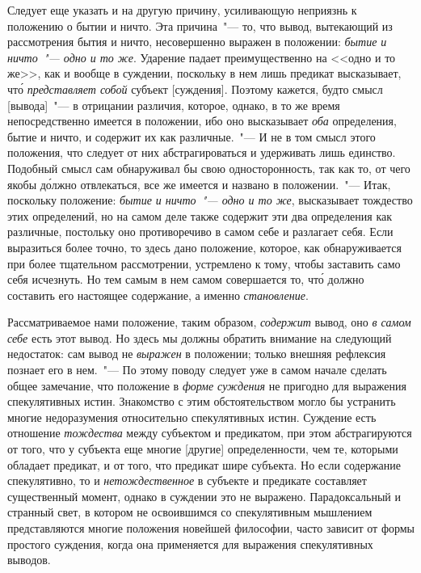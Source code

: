 Следует еще указать и на другую причину, усиливающую
неприязнь к положению о бытии и ничто. Эта причина~"--- то,
что вывод, вытекающий из рассмотрения бытия
и ничто, несовершенно выражен в положении: \emph{бытие
и ничто~"--- одно и то же}. Ударение падает преимущественно
на <<одно и то же>>, как и вообще в суждении, поскольку
в нем лишь предикат высказывает, чт\'о \emph{представляет
собой} субъект [суждения]. Поэтому кажется, будто смысл
[вывода]~"--- в отрицании различия, которое, однако, в то
же время непосредственно имеется в положении, ибо оно
высказывает \emph{оба} определения, бытие и ничто, и содержит
их как различные.~"--- И не в том смысл этого положения,
что следует от них абстрагироваться и удерживать лишь
единство. Подобный смысл сам обнаруживал бы свою односторонность,
так как то, от чего якобы д\'олжно отвлекаться,
все же имеется и названо в положении.~"--- Итак,
поскольку положение: \emph{бытие и ничто~"--- одно и то же}, высказывает
тождество этих определений, но на самом деле
также содержит эти два определения как различные, постольку
оно противоречиво в самом себе и разлагает себя.
Если выразиться более точно, то здесь дано положение,
которое, как обнаруживается при более тщательном
рассмотрении, устремлено к тому, чтобы заставить само
себя исчезнуть. Но тем самым в нем самом совершается
то, чт\'о должно составить его настоящее содержание, а
именно \emph{становление}.

Рассматриваемое нами положение, таким образом, \emph{содержит}
вывод, оно \emph{в самом себе} есть этот вывод. Но здесь
мы должны обратить внимание на следующий недостаток:
сам вывод не \emph{выражен} в положении; только внешняя рефлексия
познает его в нем.~"--- По этому поводу следует
уже в самом начале сделать общее замечание, что положение
в \emph{форме суждения} не пригодно для выражения
спекулятивных истин. Знакомство с этим обстоятельством
могло бы устранить многие недоразумения относительно
спекулятивных истин. Суждение есть отношение \emph{тождества}
между субъектом и предикатом, при этом абстрагируются
от того, что у субъекта еще многие [другие] определенности,
чем те, которыми обладает предикат, и от
того, что предикат шире субъекта. Но если содержание спекулятивно,
то и \emph{нетождественное} в субъекте и предикате
составляет существенный момент, однако в суждении это
не выражено. Парадоксальный и странный свет, в котором
не освоившимся со спекулятивным мышлением представляются
многие положения новейшей философии, часто
зависит от формы простого суждения, когда она применяется
для выражения спекулятивных выводов.

